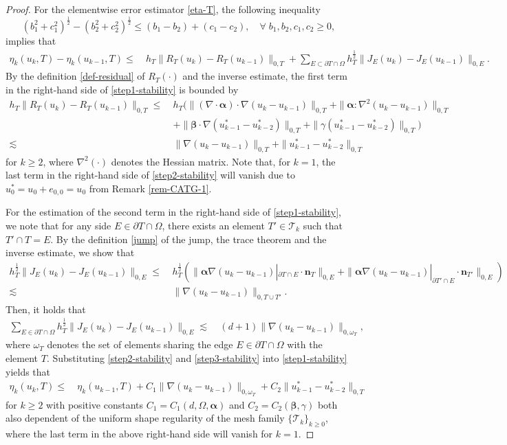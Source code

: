 \documentclass[10pt,a4paper]{amsart}
\newcommand{\LtwD}[2]{\|#1\|_{0,#2}}
\newcommand{\LtwE}[1]{\|#1\|_{0,E}}
\newcommand{\LtwT}[1]{\|#1\|_{0,T}}
\def\geq{\geqslant}
\def\leq{\leqslant}
\newcommand{\mcT}{\mathcal{T}}
\newcommand{\valpha}{\boldsymbol{\alpha}}
\newcommand{\vbeta}{\boldsymbol{\beta}}
\newcommand{\vn}{\boldsymbol{n}}
\begin{document}
\begin{proof}For the elementwise error estimator \eqref{eta-T}, the following inequality 
	$$
	(b_1^{2}+c_1^{2})^{\frac{1}{2}}-(b_2^{2}+c_2^{2})^{\frac{1}{2}}\leqslant (b_1-b_2) + (c_1 - c_2), \quad \forall \; b_1,b_2,c_1,c_2 \geqslant 0, 
	$$
implies that 
	\begin{align}
	\eta_k(u_k,T) - \eta_k(u_{k-1},T)
		\leq~&h_T\LtwT{R_T(u_k)-R_T(u_{k-1})}+ \sum_{E \subset \partial T\cap\Omega}h_T^\frac{1}{2}\LtwE{J_E(u_k)-J_E(u_{k-1})}. \label{step1-stability}
	\end{align}
By the definition \eqref{def-residual} of $R_T(\cdot)$ and the inverse estimate, the first term in the right-hand side of \eqref{step1-stability} is bounded by 
	\begin{align}
	h_T \LtwT{R_T(u_k)-R_T(u_{k-1})}  \leq~&
		h_T\Big(\LtwT{(\nabla\cdot\valpha)\cdot\nabla(u_k-u_{k-1})}
		+\LtwT{\valpha:\nabla^2(u_k-u_{k-1})}
		\nonumber\\
		&+\LtwT{\vbeta\cdot\nabla(u_{k-1}^*-u_{k-2}^*)}
		 +\LtwT{\gamma(u_{k-1}^*-u_{k-2}^*)}\Big)
		\nonumber\\
		\lesssim~& \LtwT{\nabla(u_k-u_{k-1})} + \LtwT{u_{k-1}^* - u_{k-2}^*}
		\label{step2-stability}
	\end{align}
for $k \geq 2$, where $\nabla^2(\cdot)$ denotes the Hessian matrix. Note that, for $k = 1$, the last term in the right-hand side of \eqref{step2-stability} will vanish due to $u_0^* = u_0 + e_{0,0} = u_0$ from Remark \ref{rem-CATG-1}. 

For the estimation of the second term in the right-hand side of \eqref{step1-stability}, we note that for any side $E \in \partial T \cap \Omega$, there exists an element $T' \in \mcT_k$ such that $T' \cap T=E$. By the definition \eqref{jump} of the jump, the trace theorem and the inverse estimate, we show that 
\begin{align}
	h_T^{\frac{1}{2}}\LtwE{J_E(u_k)-J_E(u_{k-1})}\leq~&
		h_T^\frac12(\LtwE{\valpha\nabla(u_k-u_{k-1})|_{\partial T \cap E}\cdot\vn_T}+\LtwE{\valpha\nabla(u_k-u_{k-1})|_{\partial T' \cap E}\cdot\vn_{T'}})
			\nonumber\\
		\lesssim~& \LtwD{\nabla(u_k-u_{k-1})}{T \cup T'}. 
			\nonumber
\end{align}
Then, it holds that 
	\begin{align}
		\sum_{E \in \partial T \cap \Omega}h_T^\frac12\LtwE{J_E(u_k)-J_E(u_{k-1})}
		\lesssim~&(d+1)\LtwD{\nabla(u_k-u_{k-1})}{\omega_T}, 
		\label{step3-stability}
	\end{align}
where $\omega_T$ denotes the set of elements sharing the edge $E \in \partial T \cap \Omega$ with the element $T$.  
Substituting \eqref{step2-stability} and \eqref{step3-stability} into \eqref{step1-stability} yields that 
	\begin{align}
		\eta_k(u_k,T) \leq~&  \eta_k(u_{k-1},T) +  C_1\LtwD{\nabla (u_k-u_{k-1})}{\omega_T} + C_2\LtwT{u_{k-1}^*-u_{k-2}^*} \nonumber
	\end{align}
for $k \geq 2$ with positive constants $C_1= C_1(d,\Omega,\valpha)$ and $C_2 = C_2(\vbeta,\gamma)$ both also dependent of the uniform shape regularity of the mesh family $\{\mcT_k\}_{k \geq 0}$, where the last term in the above right-hand side will vanish for $k = 1$. 


\end{proof}
\end{document}
